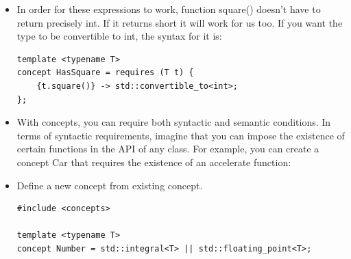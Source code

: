 \documentclass[a4paper,11pt,twoside]{book}
\begin{document}
\begin{itemize}
    \item In order for these expressions to work, function square() doesn’t have to return precisely int. If it returns short it will work for us too. If you want the type to be convertible to int, the syntax for it is:

\begin{lstlisting}
template <typename T>
concept HasSquare = requires (T t) {
	{t.square()} -> std::convertible_to<int>;
}; 
\end{lstlisting}

	\item With concepts, you can require both syntactic and semantic conditions. In terms of syntactic requirements, imagine that you can impose the existence of certain functions in the API of any class. For example, you can create a concept Car that requires the existence of an accelerate function:

    \item Define a new concept from existing concept.
\begin{lstlisting}
#include <concepts>

template <typename T>
concept Number = std::integral<T> || std::floating_point<T>;
\end{lstlisting}

\end{itemize}
\end{document}

